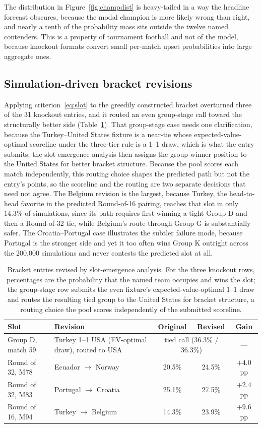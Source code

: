 \documentclass[11pt,letterpaper]{article}
\begin{document}
The distribution in Figure~\ref{fig:champdist} is heavy-tailed in a way the headline forecast obscures, because the modal champion is more likely wrong than right, and nearly a tenth of the probability mass sits outside the twelve named contenders. This is a property of tournament football and not of the model, because knockout formats convert small per-match upset probabilities into large aggregate ones.

\subsection{Simulation-driven bracket revisions}

Applying criterion~\eqref{eq:slot} to the greedily constructed bracket overturned three of the 31 knockout entries, and it routed an even group-stage call toward the structurally better side (Table~\ref{tab:revisions}). That group-stage case needs one clarification, because the Turkey--United States fixture is a near-tie whose expected-value-optimal scoreline under the three-tier rule is a 1--1 draw, which is what the entry submits; the slot-emergence analysis then assigns the group-winner position to the United States for better bracket structure. Because the pool scores each match independently, this routing choice shapes the predicted path but not the entry's points, so the scoreline and the routing are two separate decisions that need not agree. The Belgium revision is the largest, because Turkey, the head-to-head favorite in the predicted Round-of-16 pairing, reaches that slot in only 14.3\% of simulations, since its path requires first winning a tight Group D and then a Round-of-32 tie, while Belgium's route through Group G is substantially safer. The Croatia--Portugal case illustrates the subtler failure mode, because Portugal is the stronger side and yet it too often wins Group K outright across the 200{,}000 simulations and never contests the predicted slot at all.

\begin{table}[ht]
\centering\small
\caption{Bracket entries revised by slot-emergence analysis. For the three knockout rows, percentages are the probability that the named team occupies and wins the slot; the group-stage row submits the even fixture's expected-value-optimal 1--1 draw and routes the resulting tied group to the United States for bracket structure, a routing choice the pool scores independently of the submitted scoreline.}
\label{tab:revisions}
\begin{tabular}{llccc}
\toprule
Slot & Revision & Original & Revised & Gain \\
\midrule
Group D, match 59 & Turkey 1--1 USA (EV-optimal draw), routed to USA & \multicolumn{2}{c}{tied call (36.3\% / 36.3\%)} & --- \\
Round of 32, M78 & Ecuador $\to$ Norway & 20.5\% & 24.5\% & $+4.0$ pp \\
Round of 32, M83 & Portugal $\to$ Croatia & 25.1\% & 27.5\% & $+2.4$ pp \\
Round of 16, M94 & Turkey $\to$ Belgium & 14.3\% & 23.9\% & $+9.6$ pp \\
\bottomrule
\end{tabular}
\end{table}
\end{document}

